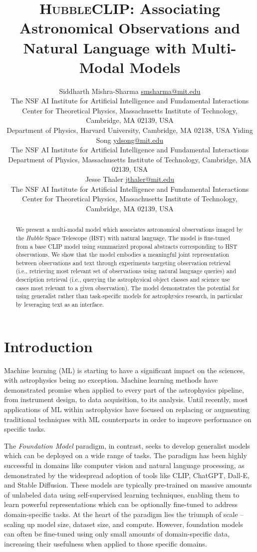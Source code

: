 \documentclass[10pt]{article} %
\title{\textsc{HubbleCLIP}: Associating Astronomical Observations and Natural Language with Multi-Modal Models}
\author{\name Siddharth Mishra-Sharma \email \href{mailto:smsharma@mit.edu}{smsharma@mit.edu} \\
      \addr The NSF AI Institute for Artificial Intelligence and Fundamental Interactions\\
      Center for Theoretical Physics, Massachusetts Institute of Technology, Cambridge, MA 02139, USA \\
      Department of Physics, Harvard University, Cambridge, MA 02138, USA
      \AND
      \name Yiding Song \email \href{mailto:ydsong@mit.edu}{ydsong@mit.edu} \\
      \addr The NSF AI Institute for Artificial Intelligence and Fundamental Interactions\\
      Department of Physics, Massachusetts Institute of Technology, Cambridge, MA 02139, USA \\
      \AND
      \name Jesse Thaler \email \href{mailto:jthaler@mit.edu}{jthaler@mit.edu} \\
      \addr The NSF AI Institute for Artificial Intelligence and Fundamental Interactions\\
      Center for Theoretical Physics, Massachusetts Institute of Technology, Cambridge, MA 02139, USA \\
}
\begin{document}
\maketitle

\begin{abstract}
We present a multi-modal model which associates astronomical observations imaged by the \emph{Hubble} Space Telescope (HST) with natural language. The model is fine-tuned from a base CLIP model using summarized proposal abstracts corresponding to HST observations. We show that the model embodies a meaningful joint representation between observations and text through experiments targeting observation retrieval (i.e., retrieving most relevant set of observations using natural language queries) and description retrieval (i.e., querying the astrophysical object classes and science use cases most relevant to a given observation). The model demonstrates the potential for using generalist rather than task-specific models for astrophysics research, in particular by leveraging text as an interface.
\end{abstract}

\section{Introduction}
\label{sec:intro}

Machine learning (ML) is starting to have a significant impact on the sciences, with astrophysics being no exception. Machine learning methods have demonstrated promise when applied to every part of the astrophysics pipeline, from instrument design, to data acquisition, to its analysis. Until recently, most applications of ML within astrophysics have focused on replacing or augmenting traditional techniques with ML counterparts in order to improve performance on specific tasks.

The \emph{Foundation Model} paradigm, in contrast, seeks to develop generalist models which can be deployed on a wide range of tasks. The paradigm has been highly successful in domains like computer vision and natural language processing, as demonstrated by the widespread adoption of tools like CLIP, ChatGPT, Dall-E, and Stable Diffusion. These models are typically pre-trained on massive amounts of unlabeled data using self-supervised learning techniques, enabling them to learn powerful representations which can be optionally fine-tuned to address domain-specific tasks. At the heart of the paradigm lies the triumph of scale -- scaling up model size, dataset size, and compute. However, foundation models can often be fine-tuned using only small amounts of domain-specific data, increasing their usefulness when applied to those specific domains.
\end{document}
